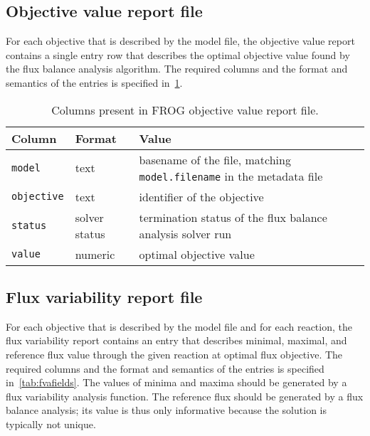 \subsection{Objective value report file}
\label{sec:obj}

For each objective that is described by the model file, the objective value report contains a single entry row that describes the optimal objective value found by the flux balance analysis algorithm. The required columns and the format and semantics of the entries is specified in~\cref{tab:objfields}.



\begin{table}[p]\tablefont
\begin{tabular}{llp{30em}}
\toprule
Column & Format & Value \\
\midrule
\verb|model|
 & text
 & basename of the file, matching \verb|model.filename| in the metadata file
 \\
\verb|objective|
 & text
 & identifier of the objective
 \\
\verb|status|
 & solver status
 & termination status of the flux balance analysis solver run
 \\
\verb|value|
 & numeric
 & optimal objective value
 \\
\bottomrule
\end{tabular}
\caption{Columns present in FROG objective value report file.}
\label{tab:objfields}
\end{table}

\subsection{Flux variability report file}
\label{sec:fva}
For each objective that is described by the model file and for each reaction, the flux variability report contains an entry that describes minimal, maximal, and reference flux value through the given reaction at optimal flux objective. The required columns and the format and semantics of the entries is specified in~\cref{tab:fvafields}. The values of minima and maxima should be generated by a flux variability analysis function. The reference flux should be generated by a flux balance analysis; its value is thus only informative because the solution is typically not unique.



